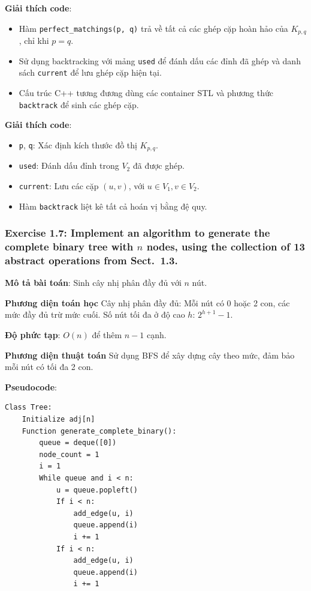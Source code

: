\documentclass[a4paper,12pt]{article}
\begin{document}
\bigskip
\textbf{Giải thích code}:
\begin{itemize}
    \item Hàm \texttt{perfect\_matchings(p, q)} trả về tất cả các ghép cặp hoàn hảo của \(K_{p,q}\), chỉ khi \(p=q\).
    \item Sử dụng backtracking với mảng \texttt{used} để đánh dấu các đỉnh đã ghép và danh sách \texttt{current} để lưu ghép cặp hiện tại.
    \item Cấu trúc C++ tương đương dùng các container STL và phương thức \texttt{backtrack} để sinh các ghép cặp.
\end{itemize}

\textbf{Giải thích code}:
\begin{itemize}
    \item \texttt{p}, \texttt{q}: Xác định kích thước đồ thị \( K_{p,q} \).
    \item \texttt{used}: Đánh dấu đỉnh trong \( V_2 \) đã được ghép.
    \item \texttt{current}: Lưu các cặp \( (u,v) \), với \( u \in V_1, v \in V_2 \).
    \item Hàm \texttt{backtrack} liệt kê tất cả hoán vị bằng đệ quy.
\end{itemize}

\subsubsection{Exercise 1.7: Implement an algorithm to generate the complete binary tree with $n$ nodes, using the collection of 13 abstract operations from Sect.~1.3.}
\textbf{Mô tả bài toán}: Sinh cây nhị phân đầy đủ với \( n \) nút.

\textbf{Phương diện toán học}
Cây nhị phân đầy đủ: Mỗi nút có 0 hoặc 2 con, các mức đầy đủ trừ mức cuối. Số nút tối đa ở độ cao \( h \): \( 2^{h+1} - 1 \).

\textbf{Độ phức tạp}: \( O(n) \) để thêm \( n-1 \) cạnh.

\textbf{Phương diện thuật toán}
Sử dụng BFS để xây dựng cây theo mức, đảm bảo mỗi nút có tối đa 2 con.

\textbf{Pseudocode}:
\begin{verbatim}
Class Tree:
    Initialize adj[n]
    Function generate_complete_binary():
        queue = deque([0])
        node_count = 1
        i = 1
        While queue and i < n:
            u = queue.popleft()
            If i < n:
                add_edge(u, i)
                queue.append(i)
                i += 1
            If i < n:
                add_edge(u, i)
                queue.append(i)
                i += 1
\end{verbatim}
\end{document}
